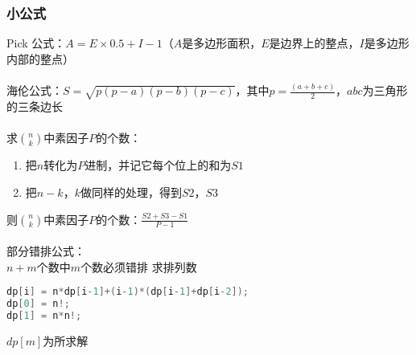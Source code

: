 	\subsubsection{小公式}
	Pick 公式：$A = E\times 0.5+I-1$（$A$是多边形面积，$E$是边界上的整点，$I$是多边形内部的整点）\\
	\\
	海伦公式：$S = \sqrt{p(p-a)(p-b)(p-c)}$，其中$p = \frac{(a+b+c)}{2}$，$abc$为三角形的三条边长\\
	\\
	求$\binom{n}{k}$中素因子$P$的个数：\\
	\begin {enumerate}
	\item 把$n$转化为$P$进制，并记它每个位上的和为$S1$
	\item 把$n-k$，$k$做同样的处理，得到$S2$，$S3$
	\end{enumerate}
	则$\binom{n}{k}$中素因子$P$的个数：$\frac{S2+S3-S1}{P-1}$\\
	\\
	部分错排公式：\\
	$n+m$个数中$m$个数必须错排 求排列数
	\begin{lstlisting}[language=c++]
dp[i] = n*dp[i-1]+(i-1)*(dp[i-1]+dp[i-2]);
dp[0] = n!;
dp[1] = n*n!;
	\end{lstlisting}
	$dp[m]$为所求解\\
